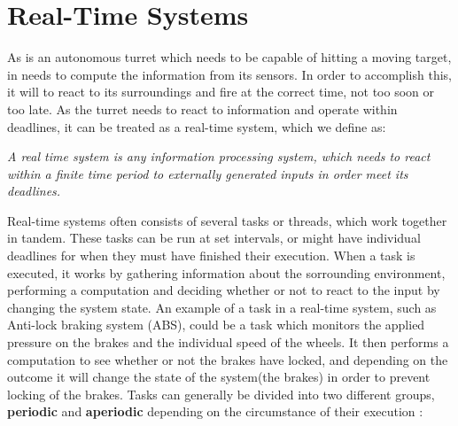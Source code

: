 \section{Real-Time Systems}\label{rts}


As \name is an autonomous turret which needs to be capable of hitting a moving
target, in needs to compute the information from its sensors. In order to
accomplish this, it will to react to its surroundings and fire at the
correct time, not too soon or too late. As the turret needs to react to
information and operate within deadlines, it can be treated as a real-time
system, which we define as:

\begin{center}
\begin{minipage}{0.8\linewidth}
\textit{A real time system is any information processing system, which needs to
react within a finite time period to externally generated inputs in order meet
its deadlines.}
\end{minipage}
\end{center} 

Real-time systems often consists of several tasks or threads, which work
together in tandem. These tasks can be run at set intervals, or might have
individual deadlines for when they must have finished their execution. When a
task is executed, it works by gathering information about the sorrounding
environment, performing a computation and deciding whether or not to react to
the input by changing the system state. An example of a task in a real-time
system, such as Anti-lock braking system (ABS), could be a task which monitors
the applied pressure on the brakes and the individual speed of the wheels. It
then performs a computation to see whether or not the brakes have locked, and
depending on the outcome it will change the state of the system(the brakes) in
order to prevent locking of the brakes. Tasks can generally be divided into two
different groups, \textbf{periodic} and \textbf{aperiodic} depending on the
circumstance of their execution \citep[ch.1A]{Realtime}:

